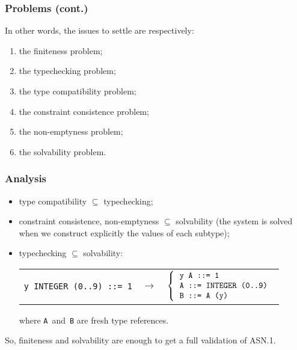 \documentclass[compress,dvips,xcolor={dvipsnames},t]{beamer}
\newcommand\ASN{\textsf{ASN.1}\xspace}
\begin{document}
\begin{frame}
\frametitle{Problems (cont.)}

In other words, the issues to settle are respectively:

\begin{enumerate}

  \item the finiteness problem;
 
  \item the typechecking problem;

  \item the type compatibility problem;

  \item the constraint consistence problem;

  \item the non-emptyness problem;

  \item the solvability problem.

\end{enumerate}

\end{frame}

\begin{frame}
\frametitle{Analysis}

\begin{itemize}

  \item type compatibility $\subseteq$ typechecking;

  \item constraint consistence, non-emptyness $\subseteq$ solvability
        (the system is solved when we construct explicitly the values
        of each subtype);

  \item typechecking $\subseteq$ solvability:
\begin{tabular}{@{}rcl@{}}
   \texttt{y INTEGER (0..9) ::= 1}
   & $\rightarrow$ 
   & $\left\{
       \begin{tabular}{l} 
           \texttt{y A ::= 1} \\
           \texttt{A ::= INTEGER (0..9)} \\
           \texttt{B ::= A (y)}
        \end{tabular}
     \right.$
\end{tabular}
where \texttt{A}~and~\texttt{B} are fresh type references.

\end{itemize}

So, finiteness and solvability are enough to get a full validation of
\ASN.

\end{frame}
\end{document}

